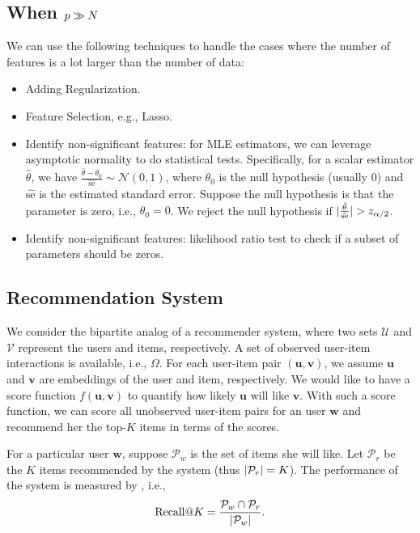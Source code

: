 {            
    \subsection{When $p \gg N$}
        We can use the following techniques to handle the cases where the number of features is a lot larger than the number of data:
            \begin{itemize}
                \item Adding Regularization.
                \item Feature Selection, e.g., Lasso.
                \item Identify non-significant features: for MLE estimators, we can leverage asymptotic normality to do statistical tests.
                Specifically, for a scalar estimator $\hat{\theta}$, we have $\frac{\hat{\theta} - \theta_0 }{\hat{\text{se}}} \sim \mathcal{N}(0, 1)$, where $\theta_0$ is the null hypothesis (usually $0$) and $\hat{\text{se}}$ is the estimated standard error.
                Suppose the null hypothesis is that the parameter is zero, i.e., $\theta_0=0$. 
                We reject the null hypothesis if $| \frac{\hat{\theta} }{\hat{\text{se}}} | > z_{\alpha/2}$.
                \item Identify non-significant features: likelihood ratio test to check if a subset of parameters should be zeros.
            \end{itemize}
            
    
    \subsection{Recommendation System}
        
        We consider the bipartite analog of a recommender system, where two sets $\mathcal{U}$ and $\mathcal{V}$ represent the users and items, respectively.
        A set of observed user-item interactions is available, i.e., $\Omega$.
        For each user-item pair $(\bm{u}, \bm{v})$, we assume $\bm{u}$ and $\bm{v}$ are embeddings of the user and item, respectively.
        We would like to have a score function $f(\bm{u}, \bm{v})$ to quantify how likely $\bm{u}$ will like $\bm{v}$.
        With such a score function, we can score all unobserved user-item pairs for an user $\bm{w}$ and recommend her the top-$K$ items in terms of the scores.
        
        For a particular user $\bm{w}$, suppose $\mathcal{P}_w$ is the set of items she will like.
        Let $\mathcal{P}_r$ be the $K$ items recommended by the system (thus $| \mathcal{P}_r | = K$).
        The performance of the system is measured by \RecallAtK, i.e., 
            \begin{equation}
                 \text{Recall}@K  = \frac{\mathcal{P}_w \cap \mathcal{P}_r}{| \mathcal{P}_w |}.
            \end{equation}
            
}
